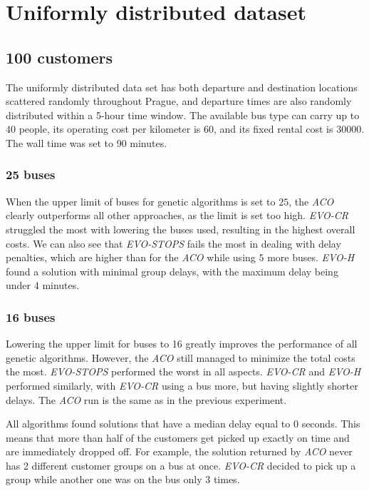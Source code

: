 \clearpage

\section{Uniformly distributed dataset}

\subsection{100 customers}

The uniformly distributed data set has both departure and destination locations scattered randomly throughout Prague, and departure times are also randomly distributed within a 5-hour time window. The available bus type can carry up to $40$ people, its operating cost per kilometer is $60$, and its fixed rental cost is $30000$. The wall time was set to 90 minutes.

\subsubsection{25 buses}

When the upper limit of buses for genetic algorithms is set to $25$, the \textit{ACO} clearly outperforms all other approaches, as the limit is set too high. \textit{EVO-CR} struggled the most with lowering the buses used, resulting in the highest overall costs. We can also see that \textit{EVO-STOPS} fails the most in dealing with delay penalties, which are higher than for the \textit{ACO} while using $5$ more buses. \textit{EVO-H} found a solution with minimal group delays, with the maximum delay being under 4 minutes.

\subsubsection{16 buses}

Lowering the upper limit for buses to 16 greatly improves the performance of all genetic algorithms. However, the \textit{ACO} still managed to minimize the total costs the most. \textit{EVO-STOPS} performed the worst in all aspects. \textit{EVO-CR} and \textit{EVO-H} performed similarly, with \textit{EVO-CR} using a bus more, but having slightly shorter delays. The \textit{ACO} run is the same as in the previous experiment.

All algorithms found solutions that have a median delay equal to $0$ seconds. This means that more than half of the customers get picked up exactly on time and are immediately dropped off. For example, the solution returned by \textit{ACO} never has 2 different customer groups on a bus at once. \textit{EVO-CR} decided to pick up a group while another one was on the bus only 3 times.

